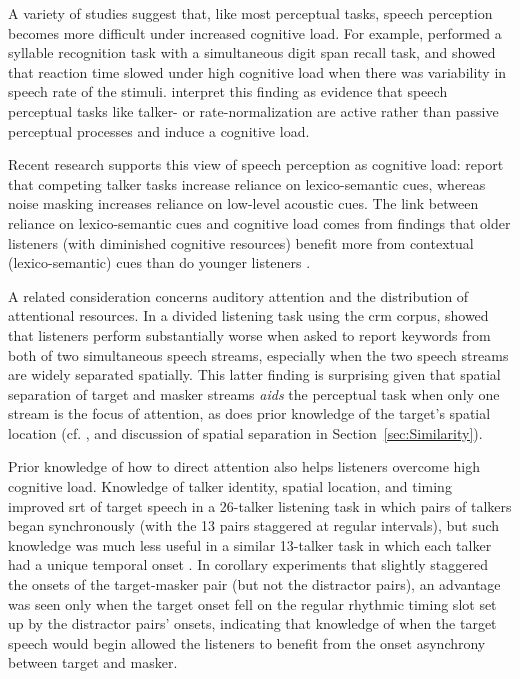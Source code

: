 
A variety of studies suggest that, like most perceptual tasks, speech perception becomes more difficult under increased cognitive load.  For example, \citet{FrancisNusbaum1996} performed a syllable recognition task with a simultaneous digit span recall task, and showed that reaction time slowed under high cognitive load when there was variability in speech rate of the stimuli.  \citeauthor{FrancisNusbaum1996} interpret this finding as evidence that speech perceptual tasks like talker- or rate-normalization are active rather than passive perceptual processes and induce a cognitive load.  

Recent research supports this view of speech perception as cognitive load: \citet{MattysEtAl2009} report that competing talker tasks increase reliance on lexico-semantic cues, whereas noise masking increases reliance on low-level acoustic cues.  The link between reliance on lexico-semantic cues and cognitive load comes from findings that older listeners (with diminished cognitive resources) benefit more from contextual (lexico-semantic) cues than do younger listeners \citep{PichoraFullerEtAl1995, SommersDanielson1999}.  %

A related consideration concerns auditory attention and the distribution of attentional resources.  In a divided listening task using the \ac{crm} corpus, \citet{BestEtAl2006} showed that listeners perform substantially worse when asked to report keywords from both of two simultaneous speech streams, especially when the two speech streams are widely separated spatially.  This latter finding is surprising given that spatial separation of target and masker streams {\em aids} the perceptual task when only one stream is the focus of attention, as does prior knowledge of the target’s spatial location (cf. \citealt{KiddEtAl2005a}, and discussion of spatial separation in Section~\ref{sec:Similarity}).  

Prior knowledge of how to direct attention also helps listeners overcome high cognitive load.  Knowledge of talker identity, spatial location, and timing improved \ac{srt} of target speech in a 26-talker listening task in which pairs of talkers began synchronously (with the 13 pairs staggered at regular intervals), but such knowledge was much less useful in a similar 13-talker task in which each talker had a unique temporal onset \citep{KitterickEtAl2010}.  In corollary experiments that slightly staggered the onsets of the target-masker pair (but not the distractor pairs), an advantage was seen only when the target onset fell on the regular rhythmic timing slot set up by the distractor pairs’ onsets, indicating that knowledge of when the target speech would begin allowed the listeners to benefit from the onset asynchrony between target and masker.

